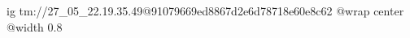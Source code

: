  
 
 
 
 

\qqSecOrig


\ifcmt
  ig tm://27_05_22.19.35.49@91079669ed8867d2e6d78718e60e8c62
  @wrap center
  @width 0.8
\fi

